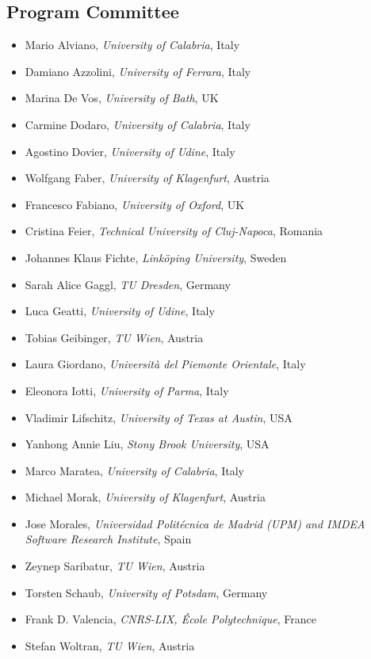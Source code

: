 \documentclass[
]{ceurart}
\begin{document}
\subsection*{Program Committee}
\begin{itemize}
\item Mario Alviano, \emph{University of Calabria}, Italy
\item Damiano Azzolini, \emph{University of Ferrara}, Italy
\item Marina De Vos, \emph{University of Bath}, UK
\item Carmine Dodaro, \emph{University of Calabria}, Italy
\item Agostino Dovier, \emph{University of Udine}, Italy
\item Wolfgang Faber, \emph{University of Klagenfurt}, Austria
\item Francesco Fabiano, \emph{University of Oxford}, UK
\item Cristina Feier, \emph{Technical University of Cluj-Napoca}, Romania
\item Johannes Klaus Fichte, \emph{Linköping University}, Sweden
\item Sarah Alice Gaggl, \emph{TU Dresden}, Germany
\item Luca Geatti, \emph{University of Udine}, Italy
\item Tobias Geibinger, \emph{TU Wien}, Austria
\item Laura Giordano, \emph{Università del Piemonte Orientale}, Italy
\item Eleonora Iotti, \emph{University of Parma}, Italy
\item Vladimir Lifschitz, \emph{University of Texas at Austin}, USA
\item Yanhong Annie Liu, \emph{Stony Brook University}, USA
\item Marco Maratea, \emph{University of Calabria}, Italy
\item Michael Morak, \emph{University of Klagenfurt}, Austria
\item Jose Morales, \emph{Universidad Politécnica de Madrid (UPM) and IMDEA Software Research Institute}, Spain
\item Zeynep Saribatur, \emph{TU Wien}, Austria
\item Torsten Schaub, \emph{University of Potsdam}, Germany
\item Frank D. Valencia, \emph{CNRS-LIX, École Polytechnique}, France
\item Stefan Woltran, \emph{TU Wien}, Austria
\end{itemize}
\end{document}
